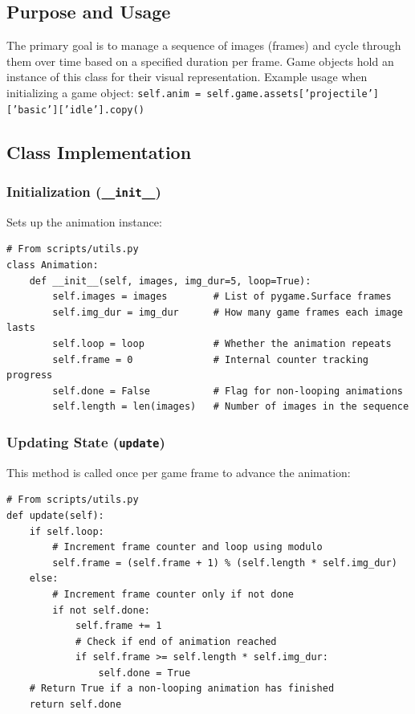 \documentclass[11pt, a4paper]{article}
\begin{document}
\subsection{Purpose and Usage}

The primary goal is to manage a sequence of images (frames) and cycle through them over time based on a specified duration per frame. Game objects hold an instance of this class for their visual representation. Example usage when initializing a game object:
\texttt{self.anim = self.game.assets['projectile']['basic']['idle'].copy()}

\subsection{Class Implementation}

\subsubsection{Initialization (\texttt{\_\_init\_\_})}

Sets up the animation instance:

\begin{lstlisting}[caption={Animation Class \_\_init\_\_ Snippet}, label={lst:animation_init}]
# From scripts/utils.py
class Animation:
    def __init__(self, images, img_dur=5, loop=True):
        self.images = images        # List of pygame.Surface frames
        self.img_dur = img_dur      # How many game frames each image lasts
        self.loop = loop            # Whether the animation repeats
        self.frame = 0              # Internal counter tracking progress
        self.done = False           # Flag for non-looping animations
        self.length = len(images)   # Number of images in the sequence
\end{lstlisting}

\subsubsection{Updating State (\texttt{update})}

This method is called once per game frame to advance the animation:

\begin{lstlisting}[caption={Animation.update() Logic}, label={lst:animation_update}]
# From scripts/utils.py
def update(self):
    if self.loop:
        # Increment frame counter and loop using modulo
        self.frame = (self.frame + 1) % (self.length * self.img_dur)
    else:
        # Increment frame counter only if not done
        if not self.done:
            self.frame += 1
            # Check if end of animation reached
            if self.frame >= self.length * self.img_dur:
                self.done = True
    # Return True if a non-looping animation has finished
    return self.done
\end{lstlisting}
\end{document}
